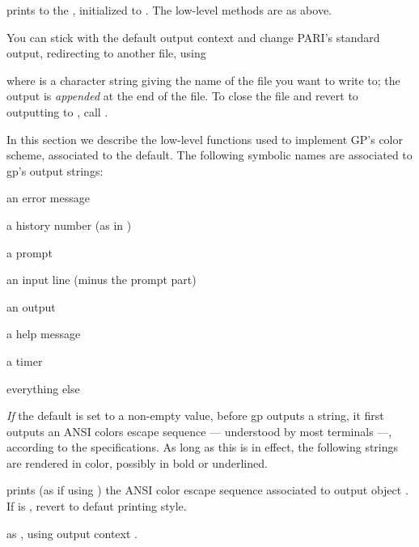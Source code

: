  prints to the  , initialized
to . The low-level methods are as above.

You can stick with the default  output context and change PARI's
standard output, redirecting  to another file, using

 where  is a character string
giving the name of the file you want to write to; the output is
\emph{appended} at the end of the file. To close the file and revert to
outputting to , call .

In this section we describe the low-level functions used to implement GP's
color scheme, associated to the  default. The following symbolic
names are associated to gp's output strings:

\item {} an error message

\item {} a history number (as in )

\item {} a prompt

\item {} an input line (minus the prompt part)

\item {} an output

\item {} a help message

\item {} a timer

\item {} everything else

\emph{If} the  default is set to a non-empty value, before gp
outputs a string, it first outputs an ANSI colors escape sequence ---
understood by most terminals ---, according to the 
specifications. As long as this is in effect, the following strings are
rendered in color, possibly in bold or underlined.

 prints (as if using ) the ANSI
color escape sequence associated to output object . If  is
, revert to defaut printing style.

 as ,
using output context .

